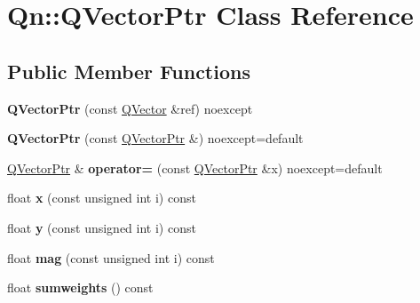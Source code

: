 \hypertarget{classQn_1_1QVectorPtr}{}\section{Qn\+:\+:Q\+Vector\+Ptr Class Reference}
\label{classQn_1_1QVectorPtr}
\subsection*{Public Member Functions}
\begin{DoxyCompactItemize}
\item 
\mbox{\label{classQn_1_1QVectorPtr_a1ef0ff416541f560d8646cb7dc25a723}} 
{\bfseries Q\+Vector\+Ptr} (const \mbox{\hyperlink{classQn_1_1QVector}{Q\+Vector}} \&ref) noexcept
\item 
\mbox{\label{classQn_1_1QVectorPtr_a50840c3e40cf90a13c99becfdd6d1478}} 
{\bfseries Q\+Vector\+Ptr} (const \mbox{\hyperlink{classQn_1_1QVectorPtr}{Q\+Vector\+Ptr}} \&) noexcept=default
\item 
\mbox{\label{classQn_1_1QVectorPtr_a8cea498e4dcfa1d65783e0df27e020a4}} 
\mbox{\hyperlink{classQn_1_1QVectorPtr}{Q\+Vector\+Ptr}} \& {\bfseries operator=} (const \mbox{\hyperlink{classQn_1_1QVectorPtr}{Q\+Vector\+Ptr}} \&x) noexcept=default
\item 
\mbox{\label{classQn_1_1QVectorPtr_af24a75a2d88ba294fb3a51698183203a}} 
float {\bfseries x} (const unsigned int i) const
\item 
\mbox{\label{classQn_1_1QVectorPtr_a001ed2fcff564dd22b3efd9096960e41}} 
float {\bfseries y} (const unsigned int i) const
\item 
\mbox{\label{classQn_1_1QVectorPtr_a58a1a1d73b4e2e1d33b674a392d4c2e3}} 
float {\bfseries mag} (const unsigned int i) const
\item 
\mbox{\label{classQn_1_1QVectorPtr_a557e57385264d8e32525b5aba601113f}} 
float {\bfseries sumweights} () const
\item 
\mbox{\label{classQn_1_1QVectorPtr_ac5d581393bc2530ac98e6c1b7921f8d5}} 

\end{DoxyCompactItemize}
